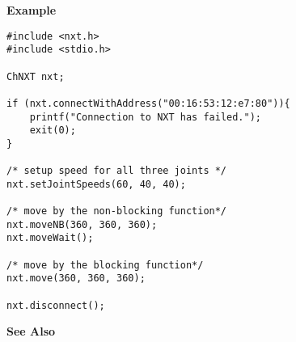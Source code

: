 \noindent
{\bf Example}
\begin{verbatim}
#include <nxt.h> 
#include <stdio.h>

ChNXT nxt;

if (nxt.connectWithAddress("00:16:53:12:e7:80")){
    printf("Connection to NXT has failed.");
    exit(0);
}
 
/* setup speed for all three joints */
nxt.setJointSpeeds(60, 40, 40);

/* move by the non-blocking function*/
nxt.moveNB(360, 360, 360);
nxt.moveWait();

/* move by the blocking function*/
nxt.move(360, 360, 360);

nxt.disconnect();
\end{verbatim}

\noindent
{\bf See Also}\\
